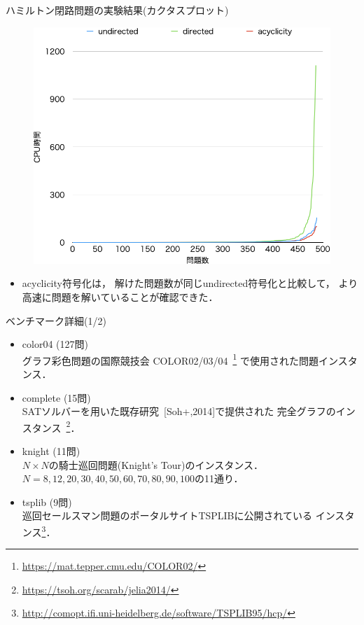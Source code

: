 \documentclass[dvipdfmx]{beamer}
\begin{document}
\begin{frame}{ハミルトン閉路問題の実験結果(カクタスプロット)}
\begin{figure}[tb]
\begin{center}
  \includegraphics[width=0.7\linewidth]{fig/cactus_old.png}
\label{cactus}
\end{center}
\end{figure}

\begin{itemize}
\item \textsf{acyclicity}符号化は，
  解けた問題数が同じ\textsf{undirected}符号化と比較して，
  より高速に問題を解いていることが確認できた．
\end{itemize}
\end{frame}
\begin{frame}[noframenumbering]{ベンチマーク詳細(1/2)}
\begin{itemize}
\item \textsf{color04} (127問)\\
  グラフ彩色問題の国際競技会
  COLOR02/03/04~\footnote{\url{https://mat.tepper.cmu.edu/COLOR02/}}
  で使用された問題インスタンス．
\item \textsf{complete} (15問)\\
  SATソルバーを用いた既存研究~{\scriptsize[Soh+,2014]}で提供された
  完全グラフのインスタンス~\footnote{\url{https://tsoh.org/scarab/jelia2014/}}．
\item \textsf{knight} (11問)\\
  $N\times N$の騎士巡回問題(Knight's Tour)のインスタンス．\\
  $N=8,12,20,30,40,50,60,70,80,90,100$の11通り．
\item \textsf{tsplib} (9問)\\
  巡回セールスマン問題のポータルサイトTSPLIBに公開されている
  インスタンス\footnote{\url{http://comopt.ifi.uni-heidelberg.de/software/TSPLIB95/hcp/}}．
\end{itemize}  
\end{frame}
\end{document}
